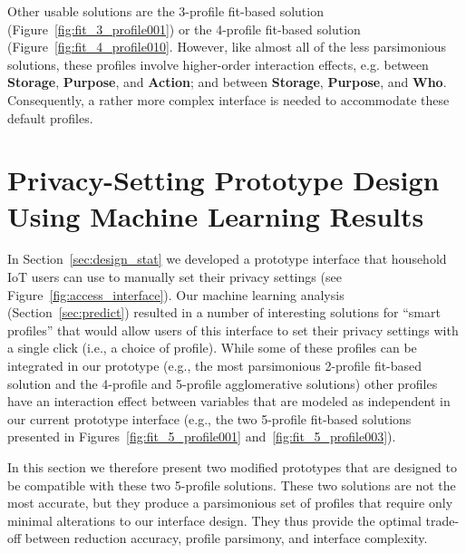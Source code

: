 Other usable solutions are the 3-profile fit-based solution (Figure~\ref{fig:fit_3_profile001}) or the 4-profile fit-based solution (Figure~\ref{fig:fit_4_profile010}. However, like almost all of the less parsimonious solutions, these profiles involve higher-order interaction effects, e.g. between \textbf{Storage}, \textbf{Purpose}, and \textbf{Action}; and between \textbf{Storage}, \textbf{Purpose}, and \textbf{Who}. Consequently, a rather more complex interface is needed to accommodate these default profiles.

\section{Privacy-Setting Prototype Design Using Machine Learning Results}\label{sec:design_ml}
In Section~\ref{sec:design_stat} we developed a prototype interface that household IoT users can use to manually set their privacy settings (see Figure~\ref{fig:access_interface}). Our machine learning analysis (Section~\ref{sec:predict}) resulted in a number of interesting solutions for ``smart profiles'' that would allow users of this interface to set their privacy settings with a single click (i.e., a choice of profile). While some of these profiles can be integrated in our prototype (e.g., the most parsimonious 2-profile fit-based solution and the 4-profile and 5-profile agglomerative solutions) other profiles have an interaction effect between variables that are modeled as independent in our current prototype interface (e.g., the two 5-profile fit-based solutions presented in Figures~\ref{fig:fit_5_profile001} and~\ref{fig:fit_5_profile003}).

In this section we therefore present two modified prototypes that are designed to be compatible with these two 5-profile solutions. These two solutions are not the most accurate, but they produce a parsimonious set of profiles that require only minimal alterations to our interface design. They thus provide the optimal trade-off between reduction accuracy, profile parsimony, and interface complexity.

